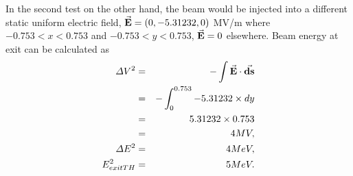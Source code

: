 \documentclass[a4paper,oneside,12pt]{report}
\numberwithin{equation}{chapter}
\begin{document}
In the second test on the other hand, the beam would be injected into a different static uniform electric field,
$\vec{\textbf{E}}=(0, -5.31232, 0)$ MV/m where $-0.753<x<0.753$ and $-0.753<y<0.753$, $\vec{\textbf{E}}=0$ elsewhere.
Beam energy at exit can be calculated as
\vspace{-10pt}\begin{eqnarray}
    \Delta V^2   &=& - \int \dotProdBF{E}{ds} \nonumber \\
                 &=& - \int_{0}^{0.753} -5.31232 \times dy \nonumber \\
                 &=& 5.31232 \times 0.753 \nonumber \\
                 &=& 4 MV, \\
    \Delta E^2   &=& 4 MeV, \\
    E_{exitTH}^2 &=& 5 MeV.
\vspace{-10pt}\end{eqnarray}
\end{document}
